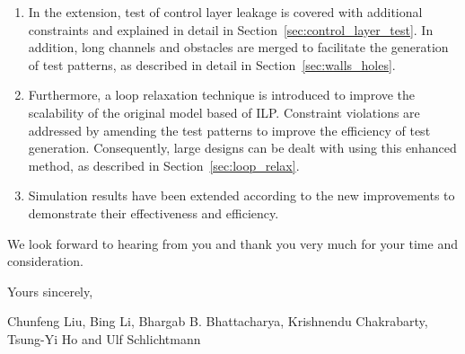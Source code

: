 \begin{table*}
\begin{center}
\begin{minipage}[t][21.5cm][t]{12.8cm}
\begin{enumerate}
  \item In the extension, test of control layer leakage is covered with additional
    constraints and explained in detail in Section~\ref{sec:control_layer_test}.
    In addition, long channels and obstacles are merged to facilitate 
    the generation of test patterns, as described in detail in Section~\ref{sec:walls_holes}. 

  \item Furthermore, a loop relaxation technique is introduced to improve the scalability of the
    original model based of ILP. Constraint violations are addressed by
    amending the test patterns to improve the efficiency of test
    generation. Consequently, large designs can be dealt with using this
    enhanced method, as described in Section~\ref{sec:loop_relax}.

  \item Simulation results have been extended according to the new improvements 
    to demonstrate their effectiveness and efficiency.

\end{enumerate} 


\vspace{10pt}


We look forward to hearing from you 
and thank you very much for your time and consideration.


\vspace{25pt}

Yours sincerely,

\vspace{10pt}
Chunfeng Liu, Bing Li, Bhargab B. Bhattacharya, Krishnendu Chakrabarty,
Tsung-Yi Ho and Ulf Schlichtmann \\



\end{minipage}
\end{center}
\end{table*}

\clearpage
\setcounter{page}{0} 
